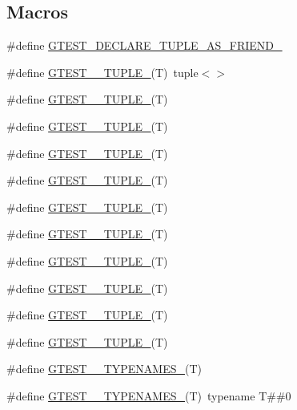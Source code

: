 \subsection*{Macros}
\begin{DoxyCompactItemize}
\item 
\#define \hyperlink{gtest-tuple_8h_a2b20671273f514a88a6e9b8328e5f257}{G\+T\+E\+S\+T\+\_\+\+D\+E\+C\+L\+A\+R\+E\+\_\+\+T\+U\+P\+L\+E\+\_\+\+A\+S\+\_\+\+F\+R\+I\+E\+N\+D\+\_\+}
\item 
\#define \hyperlink{gtest-tuple_8h_acecddf48fa29ec4b0199d5a467e89778}{G\+T\+E\+S\+T\+\_\+\_\+\+T\+U\+P\+L\+E\+\_\+}(T)~tuple$<$$>$
\item 
\#define \hyperlink{gtest-tuple_8h_a544374090885c4127adc2c618570323c}{G\+T\+E\+S\+T\+\_\+\_\+\+T\+U\+P\+L\+E\+\_\+}(T)
\item 
\#define \hyperlink{gtest-tuple_8h_a93229c3f009273c73eca237b4d19f326}{G\+T\+E\+S\+T\+\_\+\_\+\+T\+U\+P\+L\+E\+\_\+}(T)
\item 
\#define \hyperlink{gtest-tuple_8h_af2c3eab3f1a5197b408fce44eb3ed9da}{G\+T\+E\+S\+T\+\_\+\_\+\+T\+U\+P\+L\+E\+\_\+}(T)
\item 
\#define \hyperlink{gtest-tuple_8h_a3625feb24d5e6eb9926fd558e4a2e3ff}{G\+T\+E\+S\+T\+\_\+\_\+\+T\+U\+P\+L\+E\+\_\+}(T)
\item 
\#define \hyperlink{gtest-tuple_8h_a64e6f4a4cf55f62cde94066c6d5d5c74}{G\+T\+E\+S\+T\+\_\+\_\+\+T\+U\+P\+L\+E\+\_\+}(T)
\item 
\#define \hyperlink{gtest-tuple_8h_a53f36c86a979ed8285bf3c6f82f16483}{G\+T\+E\+S\+T\+\_\+\_\+\+T\+U\+P\+L\+E\+\_\+}(T)
\item 
\#define \hyperlink{gtest-tuple_8h_a8987baf82ee028d1d778447413a02c0c}{G\+T\+E\+S\+T\+\_\+\_\+\+T\+U\+P\+L\+E\+\_\+}(T)
\item 
\#define \hyperlink{gtest-tuple_8h_a2bc36d1a71a551e6cda2ac5504fb7ce3}{G\+T\+E\+S\+T\+\_\+\_\+\+T\+U\+P\+L\+E\+\_\+}(T)
\item 
\#define \hyperlink{gtest-tuple_8h_a1a81c17bfe3cdceb4d56b15985a44a7e}{G\+T\+E\+S\+T\+\_\+\_\+\+T\+U\+P\+L\+E\+\_\+}(T)
\item 
\#define \hyperlink{gtest-tuple_8h_a275e7bcd84299cc44b9c1dba971951c4}{G\+T\+E\+S\+T\+\_\+\_\+\+T\+U\+P\+L\+E\+\_\+}(T)
\item 
\#define \hyperlink{gtest-tuple_8h_ac6784ade57659fbc58baa03c265ca0ac}{G\+T\+E\+S\+T\+\_\+\_\+\+T\+Y\+P\+E\+N\+A\+M\+E\+S\+\_\+}(T)
\item 
\#define \hyperlink{gtest-tuple_8h_a2042d8e9fefb83752b1028d640adfaf2}{G\+T\+E\+S\+T\+\_\+\_\+\+T\+Y\+P\+E\+N\+A\+M\+E\+S\+\_\+}(T)~typename T\#\#0
$$
\end{DoxyCompactItemize}

